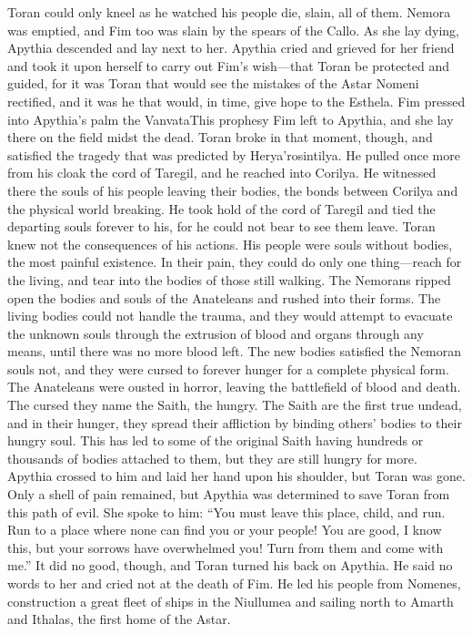 \documentclass[smalldemyvopaper,11pt,twoside,onecolumn,openright,extrafontsizes]{memoir}
\begin{document}
{{	Toran could only kneel as he watched his people die, slain, all of them. Nemora was emptied, and Fim too was slain by the spears of the Callo. As she lay dying, Apythia descended and lay next to her. Apythia cried and grieved for her friend and took it upon herself to carry out Fim’s wish—that Toran be protected and guided, for it was Toran that would see the mistakes of the Astar Nomeni rectified, and it was he that would, in time, give hope to the Esthela. Fim pressed into Apythia’s palm the VanvataThis prophesy Fim left to Apythia, and she lay there on the field midst the dead. Toran broke in that moment, though, and satisfied the tragedy that was predicted by Herya’rosintilya. He pulled once more from his cloak the cord of Taregil, and he reached into Corilya. He witnessed there the souls of his people leaving their bodies, the bonds between Corilya and the physical world breaking. He took hold of the cord of Taregil and tied the departing souls forever to his, for he could not bear to see them leave. Toran knew not the consequences of his actions. His people were souls without bodies, the most painful existence. In their pain, they could do only one thing—reach for the living, and tear into the bodies of those still walking. The Nemorans ripped open the bodies and souls of the Anateleans and rushed into their forms. The living bodies could not handle the trauma, and they would attempt to evacuate the unknown souls through the extrusion of blood and organs through any means, until there was no more blood left. The new bodies satisfied the Nemoran souls not, and they were cursed to forever hunger for a complete physical form.
	The Anateleans were ousted in horror, leaving the battlefield of blood and death. The cursed they name the Saith, the hungry. The Saith are the first true undead, and in their hunger, they spread their affliction by binding others’ bodies to their hungry soul. This has led to some of the original Saith having hundreds or thousands of bodies attached to them, but they are still hungry for more. Apythia crossed to him and laid her hand upon his shoulder, but Toran was gone. Only a shell of pain remained, but Apythia was determined to save Toran from this path of evil. She spoke to him:
	“You must leave this place, child, and run. Run to a place where none can find you or your people! You are good, I know this, but your sorrows have overwhelmed you! Turn from them and come with me.”
	It did no good, though, and Toran turned his back on Apythia. He said no words to her and cried not at the death of Fim. He led his people from Nomenes, construction a great fleet of ships in the Niullumea and sailing north to Amarth and Ithalas, the first home of the Astar.
}}
\end{document}
